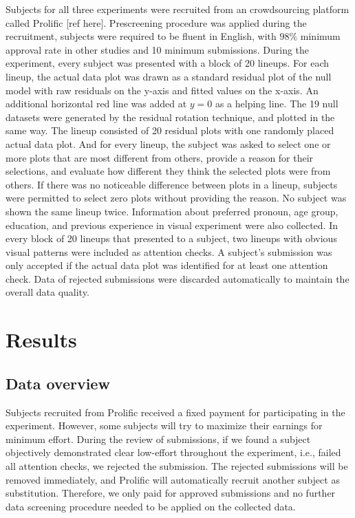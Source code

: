 \documentclass[]{interact}
\theoremstyle{plain}%
\theoremstyle{definition}
\theoremstyle{remark}
\begin{document}
Subjects for all three experiments were recruited from an crowdsourcing
platform called Prolific {[}ref here{]}. Prescreening procedure was
applied during the recruitment, subjects were required to be fluent in
English, with \(98\%\) minimum approval rate in other studies and 10
minimum submissions. During the experiment, every subject was presented
with a block of 20 lineups. For each lineup, the actual data plot was
drawn as a standard residual plot of the null model with raw residuals
on the y-axis and fitted values on the x-axis. An additional horizontal
red line was added at \(y = 0\) as a helping line. The 19 null datasets
were generated by the residual rotation technique, and plotted in the
same way. The lineup consisted of 20 residual plots with one randomly
placed actual data plot. And for every lineup, the subject was asked to
select one or more plots that are most different from others, provide a
reason for their selections, and evaluate how different they think the
selected plots were from others. If there was no noticeable difference
between plots in a lineup, subjects were permitted to select zero plots
without providing the reason. No subject was shown the same lineup
twice. Information about preferred pronoun, age group, education, and
previous experience in visual experiment were also collected. In every
block of 20 lineups that presented to a subject, two lineups with
obvious visual patterns were included as attention checks. A subject's
submission was only accepted if the actual data plot was identified for
at least one attention check. Data of rejected submissions were
discarded automatically to maintain the overall data quality.

\hypertarget{results}{%
\section{Results}\label{results}}

\hypertarget{data-overview}{%
\subsection{Data overview}\label{data-overview}}

Subjects recruited from Prolific received a fixed payment for
participating in the experiment. However, some subjects will try to
maximize their earnings for minimum effort. During the review of
submissions, if we found a subject objectively demonstrated clear
low-effort throughout the experiment, i.e., failed all attention checks,
we rejected the submission. The rejected submissions will be removed
immediately, and Prolific will automatically recruit another subject as
substitution. Therefore, we only paid for approved submissions and no
further data screening procedure needed to be applied on the collected
data.
\end{document}

